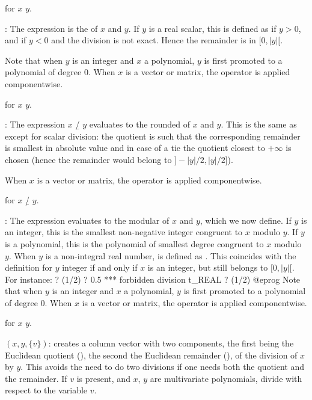  for $x$ \kbd{/} $y$.

\subseckbd{\bs}: The expression  is the  of $x$ and $y$. If $y$ is a real scalar, this is defined as
 if $y > 0$, and  if $y < 0$ and
the division is not exact. Hence the remainder 
is in $[0, |y|[$.

Note that when $y$ is an integer and $x$ a polynomial, $y$ is first promoted
to a polynomial of degree $0$. When $x$ is a vector or matrix, the operator
is applied componentwise.

 for $x$ \kbd{\bs} $y$.

\subseckbd{\bs/}: The expression $x$ \b{/} $y$ evaluates to the rounded
 of $x$ and $y$. This is the same as 
except for scalar division: the quotient is such that the corresponding
remainder is smallest in absolute value and in case of a tie the quotient
closest to $+\infty$ is chosen (hence the remainder would belong to
$]-|y|/2, |y|/2]$).

When $x$ is a vector or matrix, the operator is applied componentwise.

 for $x$ \b{/} $y$.

\subseckbd{\%}: The expression  evaluates to the modular
 of $x$ and $y$, which we now define. If $y$ is an
integer, this is the smallest non-negative integer congruent to $x$ modulo
$y$. If $y$ is a polynomial, this is the polynomial of smallest degree
congruent to $x$ modulo $y$. When $y$ is a non-integral real number,
  is defined as . This
coincides with the definition for $y$ integer if and only if $x$ is an
integer, but still belongs to $[0, |y|[$. For instance:
\bprog
? (1/2) %
? 0.5 %
  ***   forbidden division t_REAL %
? (1/2) %
@eprog
Note that when $y$ is an integer and $x$ a polynomial, $y$ is first promoted
to a polynomial of degree $0$. When $x$ is a vector or matrix, the operator
is applied componentwise.

 for $x$ \kbd{\%} $y$.

$(x,y,\{v\})$: creates a column vector with two components,
the first being the Euclidean quotient (), the second the
Euclidean remainder (), of the division of $x$ by
$y$. This avoids the need to do two divisions if one needs both the quotient
and the remainder. If $v$ is present, and $x$, $y$ are multivariate
polynomials, divide with respect to the variable $v$.

